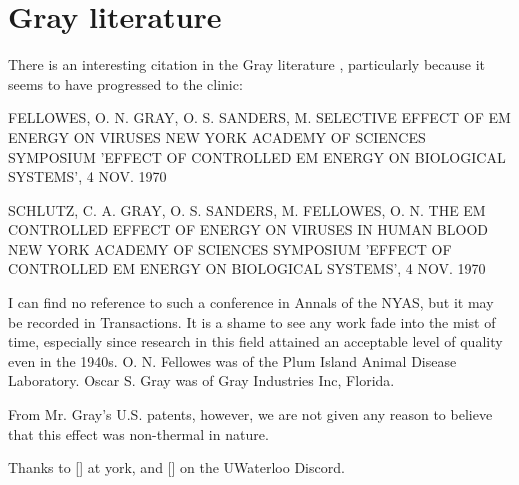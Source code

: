 \documentclass[paper.tex]{subfiles}
\begin{document}
\section{Gray literature}

There is an interesting citation in the Gray literature \cite{Index1981}, particularly because it seems to have progressed to the clinic:

FELLOWES, O. N. GRAY, O. S. SANDERS, M. SELECTIVE EFFECT OF EM ENERGY ON VIRUSES 
NEW YORK ACADEMY OF SCIENCES SYMPOSIUM 'EFFECT OF CONTROLLED EM ENERGY ON BIOLOGICAL SYSTEMS', 4 NOV. 1970

SCHLUTZ, C. A. GRAY, O. S. SANDERS, M. FELLOWES, O. N. 
THE EM CONTROLLED EFFECT OF ENERGY ON VIRUSES IN HUMAN BLOOD NEW YORK ACADEMY OF SCIENCES SYMPOSIUM 'EFFECT OF CONTROLLED EM ENERGY ON BIOLOGICAL SYSTEMS', 4 NOV. 1970

I can find no reference to such a conference in Annals of the NYAS, but it may be recorded in Transactions. It is a shame to see any work fade into the mist of time, especially since research in this field attained an acceptable level of quality even in the 1940s. O. N. Fellowes was of the Plum Island Animal Disease Laboratory. Oscar S. Gray was of Gray Industries Inc, Florida. 

From Mr. Gray's U.S. patents, however, we are not given any reason to believe that this effect was non-thermal in nature.

Thanks to [] at york, and [] on the UWaterloo Discord.
\end{document}

